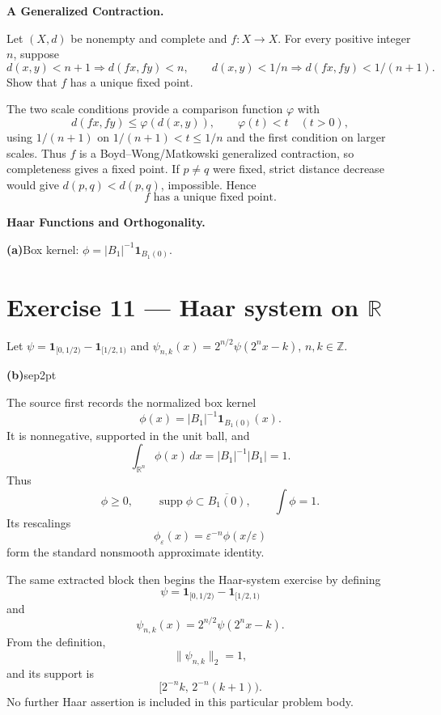 \begin{problem}[CP-II-0318]
\label{prob:cp-ii-0318}
\textbf{A Generalized Contraction.}

\hspace*{1.5em}Let \((X,d)\) be nonempty and complete and \(f:X\to X\). For every positive integer \(n\), suppose
\[
d(x,y)<n+1\Rightarrow d(fx,fy)<n,\qquad
d(x,y)<1/n\Rightarrow d(fx,fy)<1/(n+1).
\]
Show that \(f\) has a unique fixed point.
\end{problem}

\begin{solution}
The two scale conditions provide a comparison function \(\varphi\) with
\[
d(fx,fy)\le\varphi(d(x,y)),\qquad \varphi(t)<t\quad(t>0),
\]
using \(1/(n+1)\) on \(1/(n+1)<t\le1/n\) and the first condition on larger scales. Thus \(f\) is a Boyd--Wong/Matkowski generalized contraction, so completeness gives a fixed point. If \(p\ne q\) were fixed, strict distance decrease would give \(d(p,q)<d(p,q)\), impossible. Hence
\[
\boxed{f\text{ has a unique fixed point}.}
\]
\end{solution}


\begin{problem}[CP-II-0319]
\label{prob:cp-ii-0319}
\textbf{Haar Functions and Orthogonality.}

\par\smallskip\hspace*{1.5em}\textbf{(a)}\quad Box kernel: $\phi=|B_1|^{-1}\mathbf 1_{B_1(0)}$.

\bigskip
\bigskip

\section*{Exercise 11 --- Haar system on $\mathbb{R}$}

Let $\psi=\mathbf 1_{[0,1/2)}-\mathbf 1_{[1/2,1)}$ and $\psi_{n,k}(x)=2^{n/2}\psi(2^n x-k)$, $n,k\in\mathbb{Z}$.
 \par\smallskip\noindent\textbf{(b)}\quad sep2pt
\end{problem}

\begin{solution}
The source first records the normalized box kernel
\[
\phi(x)
=
|B_1|^{-1}\mathbf1_{B_1(0)}(x).
\]
It is nonnegative, supported in the unit ball, and
\[
\int_{\mathbb R^n}\phi(x)\,dx
=
|B_1|^{-1}|B_1|
=
1.
\]
Thus
\[
\boxed{
\phi\ge0,\qquad
\operatorname{supp}\phi\subset\overline{B_1(0)},\qquad
\int\phi=1.
}
\]
Its rescalings
\[
\phi_\varepsilon(x)
=
\varepsilon^{-n}\phi(x/\varepsilon)
\]
form the standard nonsmooth approximate identity.

The same extracted block then begins the Haar-system exercise by defining
\[
\psi
=
\mathbf1_{[0,1/2)}
-
\mathbf1_{[1/2,1)}
\]
and
\[
\psi_{n,k}(x)
=
2^{n/2}\psi(2^nx-k).
\]
From the definition,
\[
\|\psi_{n,k}\|_2=1,
\]
and its support is
\[
[2^{-n}k,\,2^{-n}(k+1)).
\]
No further Haar assertion is included in this particular problem body.
\end{solution}


